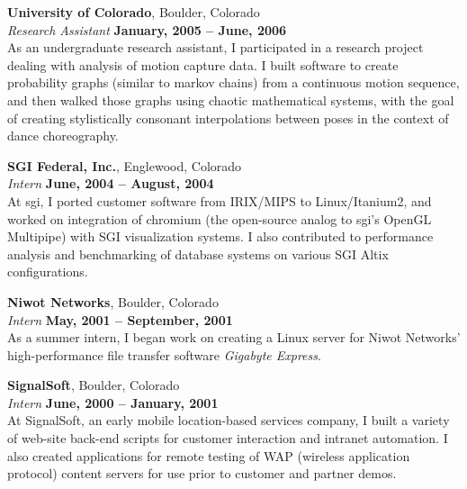 \documentclass[margin,line]{resume}
\begin{document}
\begin{resume}
        {\bf University of Colorado}, Boulder, Colorado \vspace{2mm}\\\vspace{1mm}%
        {\sl Research Assistant} \hfill {\bf January, 2005 -- June, 2006}\\
        As an undergraduate research assistant, I participated in a research
        project dealing with analysis of motion capture data. I built software to
        create probability graphs (similar to markov chains) from a continuous
        motion sequence, and then walked those graphs using chaotic mathematical
        systems, with the goal of creating stylistically consonant interpolations
        between poses in the context of dance choreography.

        {\bf SGI Federal, Inc.}, Englewood, Colorado \vspace{2mm}\\\vspace{1mm}%
        {\sl Intern} \hfill {\bf June, 2004 -- August, 2004}\\
        At sgi, I ported customer software from IRIX/MIPS to Linux/Itanium2, and
        worked on integration of chromium (the open-source analog to sgi's OpenGL
        Multipipe) with SGI visualization systems.  I also contributed to
        performance analysis and benchmarking of database systems on various SGI
        Altix configurations.

        {\bf Niwot Networks}, Boulder, Colorado \vspace{2mm}\\\vspace{1mm}%
        {\sl Intern} \hfill {\bf May, 2001 -- September, 2001}\\
        As a summer intern, I began work on creating a Linux server for Niwot
        Networks' high-performance file transfer software {\sl Gigabyte Express}.

        {\bf SignalSoft}, Boulder, Colorado \vspace{2mm}\\\vspace{1mm}%
        {\sl Intern} \hfill {\bf June, 2000 -- January, 2001}\\
        At SignalSoft, an early mobile location-based services company, I built a
        variety of web-site back-end scripts for customer interaction and intranet
        automation. I also created applications for remote testing of WAP
        (wireless application protocol) content servers for use prior to customer
        and partner demos.
    \fi


\end{resume}
\end{document}
